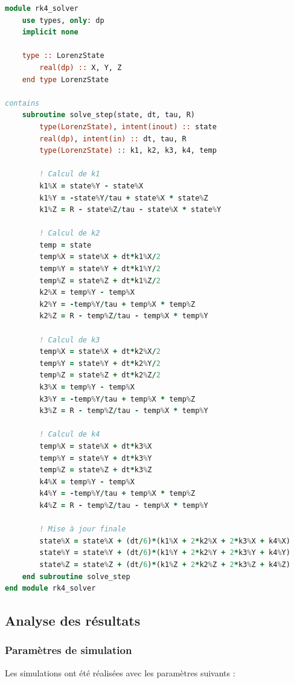 \begin{lstlisting}[language=Fortran,caption=Implémentation RK4 pour le système de Lorenz]
module rk4_solver
    use types, only: dp
    implicit none

    type :: LorenzState
        real(dp) :: X, Y, Z
    end type LorenzState

contains
    subroutine solve_step(state, dt, tau, R)
        type(LorenzState), intent(inout) :: state
        real(dp), intent(in) :: dt, tau, R
        type(LorenzState) :: k1, k2, k3, k4, temp
        
        ! Calcul de k1
        k1%X = state%Y - state%X
        k1%Y = -state%Y/tau + state%X * state%Z
        k1%Z = R - state%Z/tau - state%X * state%Y
        
        ! Calcul de k2
        temp = state
        temp%X = state%X + dt*k1%X/2
        temp%Y = state%Y + dt*k1%Y/2
        temp%Z = state%Z + dt*k1%Z/2
        k2%X = temp%Y - temp%X
        k2%Y = -temp%Y/tau + temp%X * temp%Z
        k2%Z = R - temp%Z/tau - temp%X * temp%Y
        
        ! Calcul de k3
        temp%X = state%X + dt*k2%X/2
        temp%Y = state%Y + dt*k2%Y/2
        temp%Z = state%Z + dt*k2%Z/2
        k3%X = temp%Y - temp%X
        k3%Y = -temp%Y/tau + temp%X * temp%Z
        k3%Z = R - temp%Z/tau - temp%X * temp%Y
        
        ! Calcul de k4
        temp%X = state%X + dt*k3%X
        temp%Y = state%Y + dt*k3%Y
        temp%Z = state%Z + dt*k3%Z
        k4%X = temp%Y - temp%X
        k4%Y = -temp%Y/tau + temp%X * temp%Z
        k4%Z = R - temp%Z/tau - temp%X * temp%Y
        
        ! Mise à jour finale
        state%X = state%X + (dt/6)*(k1%X + 2*k2%X + 2*k3%X + k4%X)
        state%Y = state%Y + (dt/6)*(k1%Y + 2*k2%Y + 2*k3%Y + k4%Y)
        state%Z = state%Z + (dt/6)*(k1%Z + 2*k2%Z + 2*k3%Z + k4%Z)
    end subroutine solve_step
end module rk4_solver
\end{lstlisting}

\subsection{Analyse des résultats}


\subsubsection{Paramètres de simulation}
Les simulations ont été réalisées avec les paramètres suivants :

